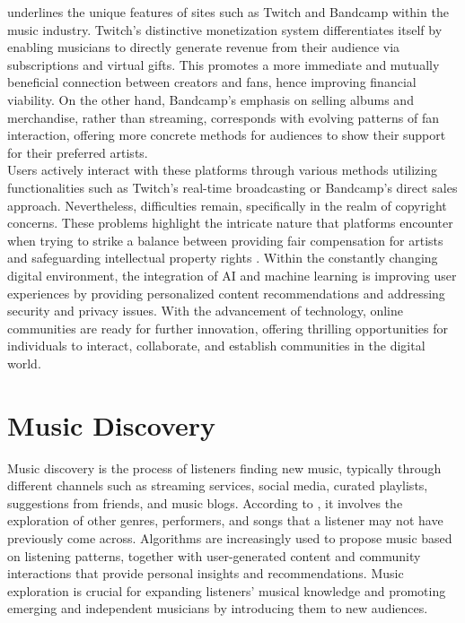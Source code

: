 \textcite{leger21} underlines the unique features of sites such as Twitch and Bandcamp within the music industry. Twitch's distinctive monetization system differentiates itself by enabling musicians to directly generate revenue from their audience via subscriptions and virtual gifts. This promotes a more immediate and mutually beneficial connection between creators and fans, hence improving financial viability. On the other hand, Bandcamp's emphasis on selling albums and merchandise, rather than streaming, corresponds with evolving patterns of fan interaction, offering more concrete methods for audiences to show their support for their preferred artists. \\

Users actively interact with these platforms through various methods utilizing functionalities such as Twitch's real-time broadcasting or Bandcamp's direct sales approach. Nevertheless, difficulties remain, specifically in the realm of copyright concerns. These problems highlight the intricate nature that platforms encounter when trying to strike a balance between providing fair compensation for artists and safeguarding intellectual property rights \parencite{leger21}. Within the constantly changing digital environment, the integration of AI and machine learning is improving user experiences by providing personalized content recommendations and addressing security and privacy issues. With the advancement of technology, online communities are ready for further innovation, offering thrilling opportunities for individuals to interact, collaborate, and establish communities in the digital world.

\section{Music Discovery}
Music discovery is the process of listeners finding new music, typically through different channels such as streaming services, social media, curated playlists, suggestions from friends, and music blogs. According to \textcite{robinson20}, it involves the exploration of other genres, performers, and songs that a listener may not have previously come across. Algorithms are increasingly used to propose music based on listening patterns, together with user-generated content and community interactions that provide personal insights and recommendations. Music exploration is crucial for expanding listeners' musical knowledge and promoting emerging and independent musicians by introducing them to new audiences.

